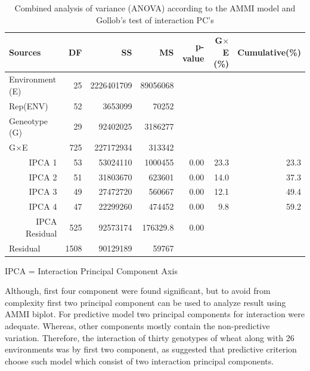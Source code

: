  \begin{table}[h!]
	\caption[Combined analysis of variance (ANOVA) according to the AMMI]{Combined analysis of variance (ANOVA) according to the AMMI model and Gollob's test of interaction PC's  } 
	
	\label{Table:4.2}
	\begin{tabular}{l r r r r r r}
		\toprule\hline
	 
	Sources                 & DF  & SS         & MS & p-value & G$\times$E (\%) & Cumulative(\%) \\
	\hline	\midrule
			Environment (E) & 25  & 2226401709 & 89056068 &            &  &\\
			Rep(ENV)        & 52  & 3653099    &  70252   &            &  &\\
			Geneotype (G)   & 29  & 92402025   & 3186277  &            &  & \\
			G$\times$E      & 725 &  227172934 &  313342  &            &  &\\ 
\multicolumn{1}{r}{	IPCA 1} & 53  & 53024110   & 1000455  & 0.00       & 23.3 & 23.3 \\
\multicolumn{1}{r}{IPCA 2}  & 51  & 31803670   & 623601   & 0.00       & 14.0 & 37.3 \\
\multicolumn{1}{r}{IPCA 3}  & 49  & 27472720   &  560667  & 0.00       & 12.1 & 49.4 \\
\multicolumn{1}{r}{IPCA 4}  & 47  & 22299260   & 474452   & 0.00       & 9.8  & 59.2 \\
\multicolumn{1}{r}{IPCA Residual}   & 525 &    92573174   & 176329.8   &  0.00  & & \\
			Residual        & 1508& 90129189   &  59767   &        & & \\ 
		\bottomrule \hline
		
	\end{tabular}
	IPCA = Interaction Principal Component Axis
\end{table}
Although, first four component were found significant, but to avoid from complexity first two principal component can be used to analyze result using AMMI biplot. For predictive model two principal components for interaction were adequate. Whereas, other components mostly contain the non-predictive variation. Therefore, the interaction of thirty genotypes of wheat along with 26 environments  was by first two component, as \cite{KAYA2002} suggested that predictive criterion choose such model which  consist of two interaction principal components.

